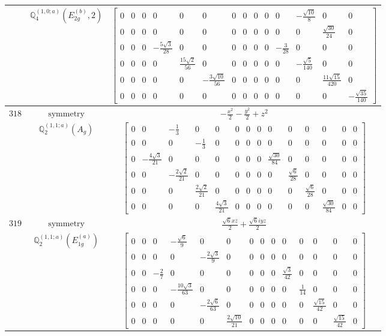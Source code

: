 \documentclass[fleqn,8pt,landscape]{jsarticle}
\begin{document}
\begin{longtable}{ccc}
$  $ & $ \mathbb{Q}_{4}^{(1,0;a)}(E_{2g}^{(b)},2) $ & $ \begin{bmatrix} 0 & 0 & 0 & 0 & 0 & 0 & 0 & 0 & 0 & 0 & 0 & - \frac{\sqrt{10}}{8} & 0 & 0 \\ 0 & 0 & 0 & 0 & 0 & 0 & 0 & 0 & 0 & 0 & 0 & 0 & \frac{\sqrt{30}}{24} & 0 \\ 0 & 0 & 0 & - \frac{5 \sqrt{3}}{28} & 0 & 0 & 0 & 0 & 0 & 0 & - \frac{3}{28} & 0 & 0 & 0 \\ 0 & 0 & 0 & 0 & \frac{15 \sqrt{2}}{56} & 0 & 0 & 0 & 0 & 0 & 0 & - \frac{\sqrt{5}}{140} & 0 & 0 \\ 0 & 0 & 0 & 0 & 0 & - \frac{3 \sqrt{10}}{56} & 0 & 0 & 0 & 0 & 0 & 0 & \frac{11 \sqrt{15}}{420} & 0 \\ 0 & 0 & 0 & 0 & 0 & 0 & 0 & 0 & 0 & 0 & 0 & 0 & 0 & - \frac{\sqrt{35}}{140} \end{bmatrix} $ \\ \hline
$ 318 $ & $ \text{symmetry} $ & $ - \frac{x^{2}}{2} - \frac{y^{2}}{2} + z^{2} $ \\
$  $ & $ \mathbb{Q}_{2}^{(1,1;a)}(A_{g}) $ & $ \begin{bmatrix} 0 & 0 & - \frac{1}{3} & 0 & 0 & 0 & 0 & 0 & 0 & 0 & 0 & 0 & 0 & 0 \\ 0 & 0 & 0 & - \frac{1}{3} & 0 & 0 & 0 & 0 & 0 & 0 & 0 & 0 & 0 & 0 \\ 0 & - \frac{4 \sqrt{3}}{21} & 0 & 0 & 0 & 0 & 0 & 0 & \frac{\sqrt{30}}{84} & 0 & 0 & 0 & 0 & 0 \\ 0 & 0 & - \frac{2 \sqrt{2}}{21} & 0 & 0 & 0 & 0 & 0 & 0 & \frac{\sqrt{6}}{28} & 0 & 0 & 0 & 0 \\ 0 & 0 & 0 & \frac{2 \sqrt{2}}{21} & 0 & 0 & 0 & 0 & 0 & 0 & \frac{\sqrt{6}}{28} & 0 & 0 & 0 \\ 0 & 0 & 0 & 0 & \frac{4 \sqrt{3}}{21} & 0 & 0 & 0 & 0 & 0 & 0 & \frac{\sqrt{30}}{84} & 0 & 0 \end{bmatrix} $ \\ \hline
$ 319 $ & $ \text{symmetry} $ & $ \frac{\sqrt{6} x z}{2} + \frac{\sqrt{6} i y z}{2} $ \\
$  $ & $ \mathbb{Q}_{2}^{(1,1;a)}(E_{1g}^{(a)}) $ & $ \begin{bmatrix} 0 & 0 & 0 & - \frac{\sqrt{6}}{9} & 0 & 0 & 0 & 0 & 0 & 0 & 0 & 0 & 0 & 0 \\ 0 & 0 & 0 & 0 & - \frac{2 \sqrt{3}}{9} & 0 & 0 & 0 & 0 & 0 & 0 & 0 & 0 & 0 \\ 0 & 0 & - \frac{2}{7} & 0 & 0 & 0 & 0 & 0 & 0 & \frac{\sqrt{3}}{42} & 0 & 0 & 0 & 0 \\ 0 & 0 & 0 & - \frac{10 \sqrt{3}}{63} & 0 & 0 & 0 & 0 & 0 & 0 & \frac{1}{14} & 0 & 0 & 0 \\ 0 & 0 & 0 & 0 & - \frac{2 \sqrt{6}}{63} & 0 & 0 & 0 & 0 & 0 & 0 & \frac{\sqrt{15}}{42} & 0 & 0 \\ 0 & 0 & 0 & 0 & 0 & \frac{2 \sqrt{10}}{21} & 0 & 0 & 0 & 0 & 0 & 0 & \frac{\sqrt{15}}{42} & 0 \end{bmatrix} $ \\ \hline

\end{longtable}
\end{document}
